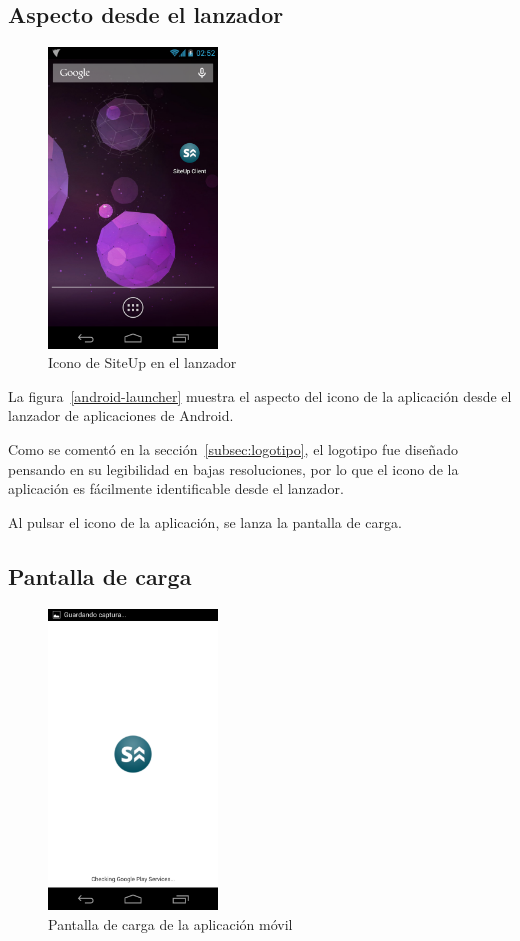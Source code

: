 \subsection{Aspecto desde el lanzador}

\begin{figure}[htbp]
  \centering
  \includegraphics[width=0.4\textwidth]{5_diseno/android-1}
  \caption{Icono de SiteUp en el lanzador}
  \label{fig:android-launcher}
\end{figure}

La figura~\ref{android-launcher} muestra el aspecto del icono de la aplicación
desde el lanzador de aplicaciones de Android. 

Como se comentó en la sección~\ref{subsec:logotipo}, el logotipo fue diseñado
pensando en su legibilidad en bajas resoluciones, por lo que el icono de la
aplicación es fácilmente identificable desde el lanzador.

Al pulsar el icono de la aplicación, se lanza la pantalla de carga.

\subsection{Pantalla de carga}

\begin{figure}[htbp]
  \centering
  \includegraphics[width=0.4\textwidth]{5_diseno/android-2}
  \caption{Pantalla de carga de la aplicación móvil}
  \label{fig:android-loading}
\end{figure}

